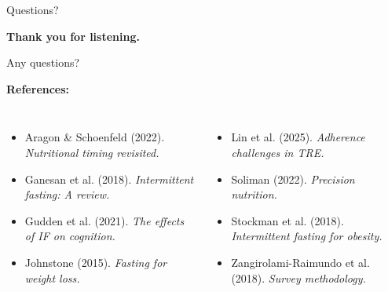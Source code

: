 \documentclass[aspectratio=169, 12pt]{beamer}
\begin{document}
\begin{frame}{Questions?}
  \begin{center}
    \Huge \textbf{Thank you for listening.}
    
    \vspace{1cm}
    \Large Any questions?
    
    \vspace{1.5cm}
    \normalsize \textbf{References:}
    \begin{columns}[T]
      \tiny
      \begin{itemize}
        \item Aragon \& Schoenfeld (2022). \textit{Nutritional timing revisited.}
        \item Ganesan et al. (2018). \textit{Intermittent fasting: A review.}
        \item Gudden et al. (2021). \textit{The effects of IF on cognition.}
        \item Johnstone (2015). \textit{Fasting for weight loss.}
      \end{itemize}
      
      \tiny
      \begin{itemize}
        \item Lin et al. (2025). \textit{Adherence challenges in TRE.}
        \item Soliman (2022). \textit{Precision nutrition.}
        \item Stockman et al. (2018). \textit{Intermittent fasting for obesity.}
        \item Zangirolami-Raimundo et al. (2018). \textit{Survey methodology.}
      \end{itemize}
    \end{columns}
  \end{center}
\end{frame}

\end{document}

